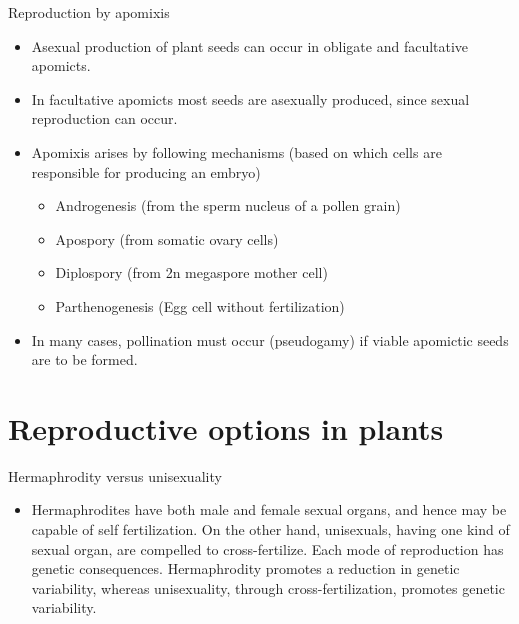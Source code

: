 \documentclass[11pt,ignorenonframetext,aspectratio=169]{beamer}
\providecommand{\tightlist}{%
  \setlength{\itemsep}{0pt}\setlength{\parskip}{0pt}}
\begin{document}
\begin{frame}{Reproduction by apomixis}
\protect\hypertarget{reproduction-by-apomixis}{}
\begin{itemize}
\tightlist
\item
  Asexual production of plant seeds can occur in obligate and
  facultative apomicts.
\item
  In facultative apomicts most seeds are asexually produced, since
  sexual reproduction can occur.
\item
  Apomixis arises by following mechanisms (based on which cells are
  responsible for producing an embryo)

  \begin{itemize}
  \tightlist
  \item
    Androgenesis (from the sperm nucleus of a pollen grain)
  \item
    Apospory (from somatic ovary cells)
  \item
    Diplospory (from 2n megaspore mother cell)
  \item
    Parthenogenesis (Egg cell without fertilization)
  \end{itemize}
\item
  In many cases, pollination must occur (pseudogamy) if viable apomictic
  seeds are to be formed.
\end{itemize}
\end{frame}

\hypertarget{reproductive-options-in-plants}{%
\section{Reproductive options in
plants}\label{reproductive-options-in-plants}}

\begin{frame}{Hermaphrodity versus unisexuality}
\protect\hypertarget{hermaphrodity-versus-unisexuality}{}
\begin{itemize}
\tightlist
\item
  Hermaphrodites have both male and female sexual organs, and hence may
  be capable of self fertilization. On the other hand, unisexuals,
  having one kind of sexual organ, are compelled to cross-fertilize.
  Each mode of reproduction has genetic consequences. Hermaphrodity
  promotes a reduction in genetic variability, whereas unisexuality,
  through cross-fertilization, promotes genetic variability.
\end{itemize}
\end{frame}
\end{document}
